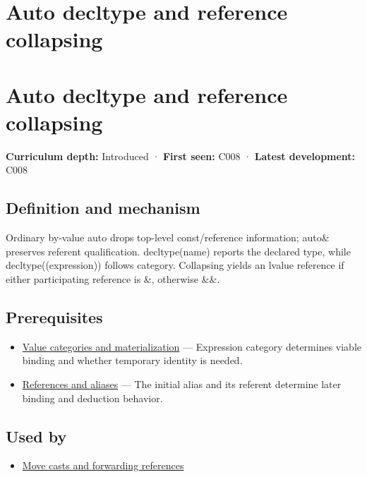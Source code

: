 \hypertarget{appendix-5d4252a42886}{}
\section*{Auto decltype and reference collapsing}
\section{Auto decltype and reference collapsing}\label{appendix-5d4252a42886-auto-decltype-and-reference-collapsing}

\textbf{Curriculum depth:} Introduced · \textbf{First seen:} C008 · \textbf{Latest development:} C008

\subsection{Definition and mechanism}\label{appendix-5d4252a42886-definition-and-mechanism}

Ordinary by-value auto drops top-level const/reference information; auto\& preserves referent qualification. decltype(name) reports the declared type, while decltype((expression)) follows category. Collapsing yields an lvalue reference if either participating reference is \&, otherwise \&\&.

\subsection{Prerequisites}\label{appendix-5d4252a42886-prerequisites}

\begin{itemize}
\tightlist
\item
  \hyperref[appendix-1121b30eaeb0]{Value categories and materialization} --- Expression category determines viable binding and whether temporary identity is needed.
\item
  \hyperref[appendix-d6d562ca9fbb]{References and aliases} --- The initial alias and its referent determine later binding and deduction behavior.
\end{itemize}

\subsection{Used by}\label{appendix-5d4252a42886-used-by}

\begin{itemize}
\tightlist
\item
  \hyperref[appendix-0104b704fb11]{Move casts and forwarding references}
\end{itemize}

